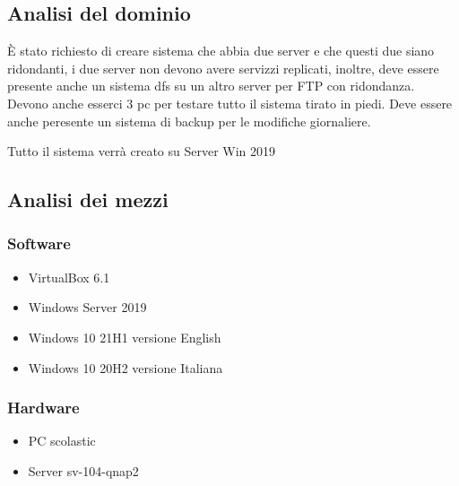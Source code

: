 \documentclass[../main.tex]{subfiles}
\begin{document}
\newcommand{\requirement}[5]{
    \bgroup{}
    \def\arraystretch{1.25}
    \begin{center}
        \begin{tabular}{|l|p{9cm}| }
            \hline
            \multicolumn{2}{|c|}{\textbf{ID: Req-#1}} \\
            \hline
            \textbf{Nome} & #2 \\
            \hline
            \textbf{Priorità} & #3 \\
            \hline
            \textbf{Versione} & #4 \\
            \hline
            \textbf{Note} & #5 \\
            \hline
        \end{tabular}
    \end{center}
    \egroup{}
}

\subsection{Analisi del dominio}
È stato richiesto di creare sistema che abbia due server e che questi due siano ridondanti, i due server non devono avere servizzi replicati, inoltre, deve essere presente anche un sistema dfs su un altro server per FTP con ridondanza. Devono anche esserci 3 pc per testare tutto il sistema tirato in piedi. Deve essere anche peresente un sistema di backup per le modifiche giornaliere. 


Tutto il sistema verrà creato su Server Win 2019


\subsection{Analisi dei mezzi}

    \subsubsection{Software}
\begin{itemize}
    \item VirtualBox 6.1
    \item Windows Server 2019
    \item Windows 10 21H1 versione English
    \item Windows 10 20H2 versione Italiana

\end{itemize}



\subsubsection{Hardware}
\begin{itemize}
    \item PC scolastic
    \item Server sv-104-qnap2


\end{itemize}
\end{document}
